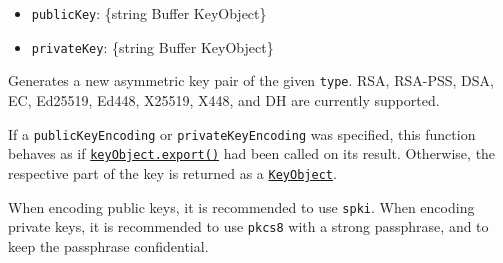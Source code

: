 \begin{itemize}
  \begin{itemize}
  \tightlist
  \item
    \texttt{publicKey}: \{string \textbar{} Buffer \textbar{}
    KeyObject\}
  \item
    \texttt{privateKey}: \{string \textbar{} Buffer \textbar{}
    KeyObject\}
  \end{itemize}
\end{itemize}

Generates a new asymmetric key pair of the given \texttt{type}. RSA,
RSA-PSS, DSA, EC, Ed25519, Ed448, X25519, X448, and DH are currently
supported.

If a \texttt{publicKeyEncoding} or \texttt{privateKeyEncoding} was
specified, this function behaves as if
\hyperref[keyobjectexportoptions]{\texttt{keyObject.export()}} had been
called on its result. Otherwise, the respective part of the key is
returned as a \hyperref[class-keyobject]{\texttt{KeyObject}}.

When encoding public keys, it is recommended to use
\texttt{\textquotesingle{}spki\textquotesingle{}}. When encoding private
keys, it is recommended to use
\texttt{\textquotesingle{}pkcs8\textquotesingle{}} with a strong
passphrase, and to keep the passphrase confidential.

\begin{Shaded}
\begin{Highlighting}[]
\NormalTok{ \{}
\OperatorTok{,}
\NormalTok{\} }\OperatorTok{=}  \NormalTok{(}\NormalTok{)}\OperatorTok{;}

\NormalTok{ \{}
\OperatorTok{,}
\OperatorTok{,}
\NormalTok{\} }\OperatorTok{=} \NormalTok{(}\OperatorTok{,}\NormalTok{ \{}
  \OperatorTok{:} \OperatorTok{,}
  \OperatorTok{:}\NormalTok{ \{}
    \OperatorTok{:} \OperatorTok{,}
    \OperatorTok{:} \OperatorTok{,}
\NormalTok{  \}}\OperatorTok{,}
  \OperatorTok{:}\NormalTok{ \{}
    \OperatorTok{:} \OperatorTok{,}
    \OperatorTok{:} \OperatorTok{,}
    \OperatorTok{:} \OperatorTok{,}
    \OperatorTok{:} \OperatorTok{,}
\NormalTok{  \}}\OperatorTok{,}
\NormalTok{\})}\OperatorTok{;}
\end{Highlighting}
\end{Shaded}

